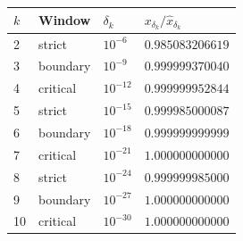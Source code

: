 \begin{center}
\begin{tabular}{@{}llll@{}}
\toprule
\(k\) & Window & \(\delta_k\) & \(x_{\delta_k}/\widehat x_{\delta_k}\)\\
\midrule
2 & strict & \(10^{-6}\) & \(0.985083206619\)\\
3 & boundary & \(10^{-9}\) & \(0.999999370040\)\\
4 & critical & \(10^{-12}\) & \(0.999999952844\)\\
5 & strict & \(10^{-15}\) & \(0.999985000087\)\\
6 & boundary & \(10^{-18}\) & \(0.999999999999\)\\
7 & critical & \(10^{-21}\) & \(1.000000000000\)\\
8 & strict & \(10^{-24}\) & \(0.999999985000\)\\
9 & boundary & \(10^{-27}\) & \(1.000000000000\)\\
10 & critical & \(10^{-30}\) & \(1.000000000000\)\\
\bottomrule
\end{tabular}
\end{center}
